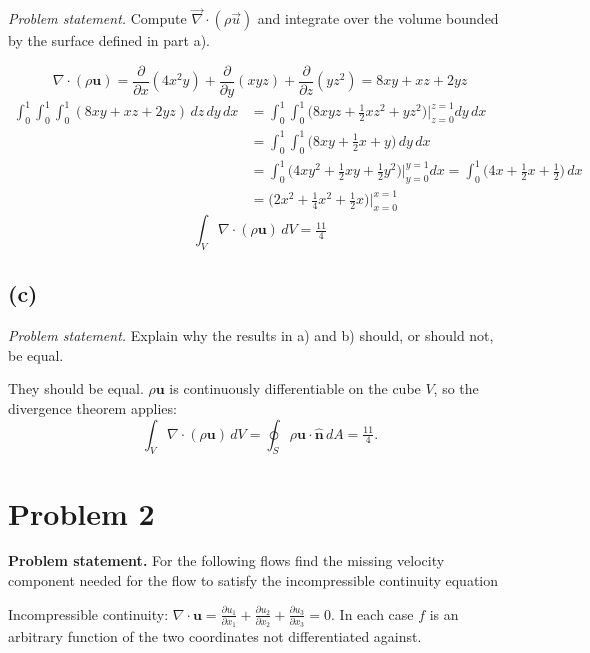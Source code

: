 \documentclass[11pt]{article}
\newcommand{\pd}[2]{\frac{\partial #1}{\partial #2}}
\newcommand{\vect}[1]{\mathbf{#1}}
\begin{document}
\noindent\textit{Problem statement.} Compute $\vec\nabla\cdot(\rho\vec u)$ and integrate over the
volume bounded by the surface defined in part a).

\begin{equation*}
\nabla\cdot(\rho\vect u) = \pd{}{x}(4x^2y) + \pd{}{y}(xyz) + \pd{}{z}(yz^2)
= \boxed{8xy + xz + 2yz}
\end{equation*}
\begin{align*}
\int_0^1\!\!\int_0^1\!\!\int_0^1 (8xy + xz + 2yz)\,dz\,dy\,dx
&= \int_0^1\!\!\int_0^1 \Big(8xyz + \tfrac12 xz^2 + yz^2\Big)\Big|_{z=0}^{z=1} dy\,dx \\
&= \int_0^1\!\!\int_0^1 \Big(8xy + \tfrac12 x + y\Big)\,dy\,dx \\
&= \int_0^1 \Big(4xy^2 + \tfrac12 xy + \tfrac12 y^2\Big)\Big|_{y=0}^{y=1} dx
 = \int_0^1 \Big(4x + \tfrac12 x + \tfrac12\Big)\,dx \\
&= \Big(2x^2 + \tfrac14 x^2 + \tfrac12 x\Big)\Big|_{x=0}^{x=1}
\end{align*}
\begin{equation*}
\boxed{\int_V \nabla\cdot(\rho\vect u)\,dV = \tfrac{11}{4}}
\end{equation*}

\subsection*{(c)}

\noindent\textit{Problem statement.} Explain why the results in a) and b) should, or should not, be
equal.

\medskip
\noindent They should be equal. $\rho\vect u$ is continuously differentiable on the cube $V$, so the divergence theorem applies:
\begin{equation*}
\int_V \nabla\cdot(\rho\vect u)\,dV = \oint_S \rho\vect u\cdot\hat{\vect n}\,dA = \tfrac{11}{4}.
\end{equation*}

\section*{Problem 2}

\noindent\textbf{Problem statement.} For the following flows find the missing velocity component
needed for the flow to satisfy the incompressible continuity equation

\medskip
\noindent Incompressible continuity: $\nabla\cdot\vect u = \pd{u_1}{x_1} + \pd{u_2}{x_2} + \pd{u_3}{x_3} = 0$.
In each case $f$ is an arbitrary function of the two coordinates not differentiated against.
\end{document}
